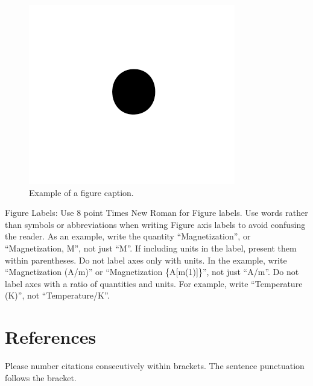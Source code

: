 \documentclass[conference]{IEEEtran}
\begin{document}
\begin{figure}[htbp]
\centerline{\includegraphics{fig1.png}}
\caption{Example of a figure caption.}
\label{fig}
\end{figure}

Figure Labels: Use 8 point Times New Roman for Figure labels. Use words 
rather than symbols or abbreviations when writing Figure axis labels to 
avoid confusing the reader. As an example, write the quantity 
``Magnetization'', or ``Magnetization, M'', not just ``M''. If including 
units in the label, present them within parentheses. Do not label axes only 
with units. In the example, write ``Magnetization (A/m)'' or ``Magnetization 
\{A[m(1)]\}'', not just ``A/m''. Do not label axes with a ratio of 
quantities and units. For example, write ``Temperature (K)'', not 
``Temperature/K''.

\section*{References}

Please number citations consecutively within brackets. The 
sentence punctuation follows the bracket.

{
\balance{
  
  
  }
}
\end{document}

